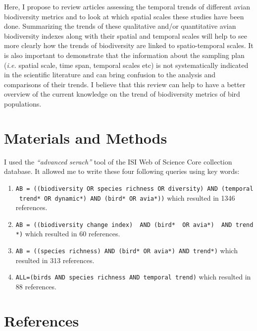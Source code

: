 \documentclass[
  12pt,
  oneside]{report}
\begin{document}
Here, I propose to review articles assessing the temporal trends of different avian biodiversity metrics and to look at which spatial scales these studies have been done. Summarizing the trends of these qualitative and/or quantitative avian biodiversity indexes along with their spatial and temporal scales will help to see more clearly how the trends of biodiversity are linked to spatio-temporal scales. It is also important to demonstrate that the information about the sampling plan (\emph{i.e.} spatial scale, time span, temporal scales etc) is not systematically indicated in the scientific literature and can bring confusion to the analysis and comparisons of their trends. I believe that this review can help to have a better overview of the current knowledge on the trend of biodiversity metrics of bird populations.

\hypertarget{materials-and-methods}{%
\chapter{Materials and Methods}\label{materials-and-methods}}

I used the \emph{\enquote{advanced serach}} tool of the ISI Web of Science Core collection database. It allowed me to write these four following queries using key words:

\begin{enumerate}
\def\labelenumi{\arabic{enumi}.}
\item
  \texttt{AB\ =\ ((biodiversity\ OR\ species\ richness\ OR\ diversity)\ AND\ (temporal\ trend*\ OR\ dynamic*)\ AND\ (bird*\ OR\ avia*))} which resulted in 1346 references.
\item
  \texttt{AB\ =\ ((biodiversity\ change\ index)\ \ AND\ (bird*\ \ OR\ avia*)\ \ AND\ trend*)} which resulted in 60 references.
\item
  \texttt{AB\ =\ ((species\ richness)\ AND\ (bird*\ OR\ avia*)\ AND\ trend*)} which resulted in 313 references.
\item
  \texttt{ALL=(birds\ AND\ species\ richness\ AND\ temporal\ trend)} which resulted in 88 references.
\end{enumerate}

\hypertarget{references}{%
\chapter*{References}\label{references}}

\singlespacing
\end{document}

